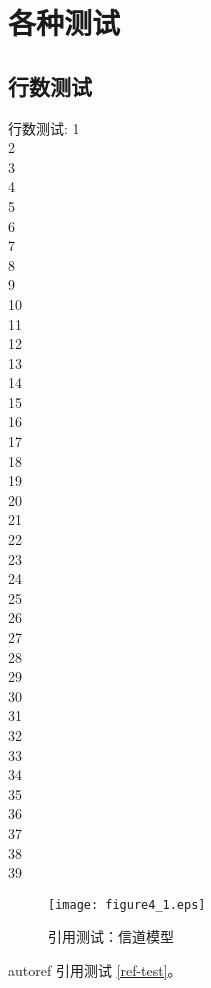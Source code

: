 
\section{各种测试}

\subsection{行数测试}
\clearpage
行数测试: 1\\
2\\
3\\
4\\
5\\
6\\
7\\
8\\
9\\
10\\
11\\
12\\
13\\
14\\
15\\
16\\
17\\
18\\
19\\
20\\
21\\
22\\
23\\
24\\
25\\
26\\
27\\
28\\
29\\
30\\
31\\
32\\
33\\
34\\
35\\
36\\
37\\
38\\
39\\


\begin{figure}[htbp]
    \centering
    \texttt{[image: figure4\_1.eps]}
    \caption{引用测试：信道模型}\label{ref-test}
\end{figure}

autoref 引用测试 \autoref{ref-test}。


